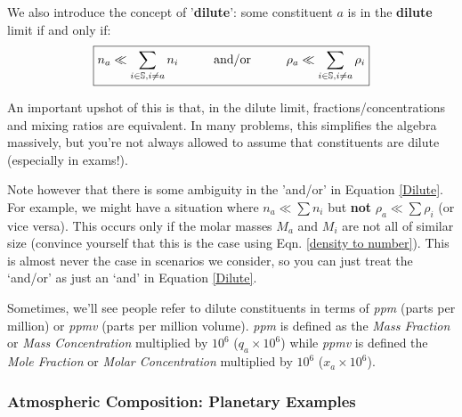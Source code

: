 We also introduce the concept of '\textbf{dilute}': some constituent $a$ is in the \textbf{dilute} limit if and only if:
\begin{align}\label{Dilute}
    \boxed{n_a\ll\sum\limits_{i\in\mathbb{S},i\neq a} n_i\hspace{10mm}\text{and/or}\hspace{10mm}
    \rho_a\ll\sum\limits_{i\in\mathbb{S},i\neq a} \rho_i}
\end{align}

An important upshot of this is that, in the dilute limit, fractions/concentrations and mixing ratios are equivalent. In many problems, this simplifies the algebra massively, but you're not always allowed to assume that constituents are dilute (especially in exams!).

Note however that there is some ambiguity in the 'and/or' in Equation \ref{Dilute}. For example, we might have a situation where $n_a\ll\sum n_i$ but \textbf{not} $\rho_a\ll\sum \rho_i$ (or vice versa). This occurs only if the molar masses $M_a$ and $M_i$ are not all of similar size (convince yourself that this is the case using Eqn. \ref{density to number}). This is almost never the case in scenarios we consider, so you can just treat the `and/or' as just an `and' in Equation \ref{Dilute}.

Sometimes, we'll see people refer to dilute constituents in terms of \textit{ppm} (parts per million) or \textit{ppmv} (parts per million volume). \textit{ppm} is defined as the \textit{Mass Fraction} or \textit{Mass Concentration} multiplied by $10^{6}$ ($q_a\times10^6$) while \textit{ppmv} is defined the \textit{Mole Fraction} or \textit{Molar Concentration} multiplied by $10^{6}$ ($x_a\times10^6$).

\subsubsection{Atmospheric Composition: Planetary Examples}

